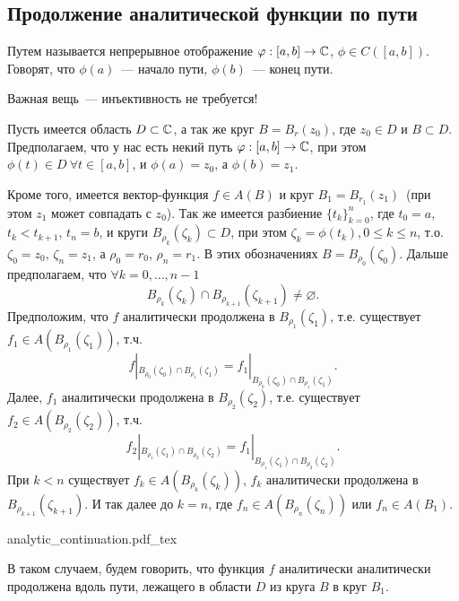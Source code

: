 \documentclass[main]{subfiles}
\begin{document}
\subsection{Продолжение аналитической функции по пути}
\begin{definition}
    Путем называется непрерывное отображение $\varphi: [a,b] \to \mathbb{C}$, $\phi \in C([a,b])$.
    Говорят, что $\phi(a)$~--- начало пути, $\phi(b)$~--- конец пути.
\end{definition}
\begin{remark}
    Важная вещь~--- инъективность не требуется!
\end{remark}
\begin{definition}
    Пусть имеется область $D \subset \mathbb{C}$, а так же круг $B = B_r(z_0)$, где $z_0 \in D$ и $B \subset D$.
    Предполагаем, что у нас есть некий путь $\varphi: [a,b] \to \mathbb{C}$, при этом $\phi(t) \in D\ \forall t \in [a,b]$, и $\phi(a) = z_0$, а $\phi(b) = z_1$.

    Кроме того, имеется вектор-функция $f \in A(B)$ и круг $B_1 = B_{r_1}(z_1)$~(при этом $z_1$ может совпадать с $z_0$).
    Так же имеется разбиение $\{t_k\}_{k=0}^n$, где $t_0 = a$, $t_k < t_{k+1}$, $t_n =b$, и круги $B_{\rho_k}(\zeta_k) \subset D$, при этом $\zeta_k = \phi(t_k), 0 \le k \le n$, т.о. $\zeta_0 = z_0$, $\zeta_n = z_1$, а $\rho_0 = r_0$, $\rho_n = r_1$.
    В этих обозначениях $B = B_{\rho_0}(\zeta_0)$.
    Дальше предполагаем, что $\forall k = 0, \dotsc, n-1$
    \[B_{\rho_k}(\zeta_k) \cap B_{\rho_{k+1}}(\zeta_{k+1}) \neq \varnothing. \]
    Предположим, что $f$ аналитически продолжена в $B_{\rho_1}(\zeta_1)$, т.е. существует $f_1 \in A(B_{\rho_1}(\zeta_1))$, т.ч.
    \[f|_{B_{\rho_0}(\zeta_0) \cap B_{\rho_{1}}(\zeta_{1})} = f_1|_{B_{\rho_0}(\zeta_0) \cap B_{\rho_{1}}(\zeta_{1})}.\]
    Далее, $f_1$ аналитически продолжена в $B_{\rho_2}(\zeta_2)$, т.е. существует $f_2 \in A(B_{\rho_2}(\zeta_2))$, т.ч.
    \[f_2|_{B_{\rho_1}(\zeta_1) \cap B_{\rho_{2}}(\zeta_{2})} = f_1|_{B_{\rho_1}(\zeta_1) \cap B_{\rho_{2}}(\zeta_{2})}.\]
    При $k < n$ существует $f_k \in A(B_{\rho_k}(\zeta_k))$, $f_k$ аналитически продолжена в $B_{\rho_{k+1}}(\zeta_{k+1})$.
    И так далее до $k=n$, где $f_n \in A(B_{\rho_n}(\zeta_n))$ или $f_n \in A(B_1)$.
    \begin{center}
        {analytic_continuation.pdf_tex}
    \end{center}
    В таком случаем, будем говорить, что функция $f$ аналитически аналитически продолжена вдоль пути, лежащего в области $D$ из круга $B$ в круг $B_1$.
\end{definition}
\end{document}
